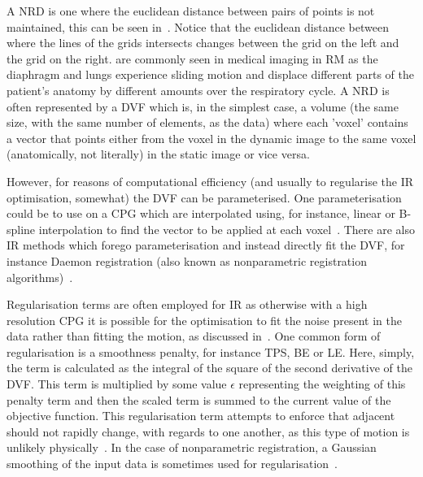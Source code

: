                 A \gls{NRD} is one where the euclidean distance between pairs of points is not maintained, this can be seen in~. Notice that the euclidean distance between where the lines of the grids intersects changes between the grid on the left and the grid on the right. %
                 are commonly seen in medical imaging in \gls{RM} as the diaphragm and lungs experience sliding motion and displace different parts of the patient's anatomy by different amounts over the respiratory cycle. A \gls{NRD} is often represented by a \gls{DVF} which is, in the simplest case, a volume (the same size, with the same number of elements, as the data) where each 'voxel' contains a vector that points either from the voxel in the dynamic image to the same voxel (anatomically, not literally) in the static image or vice versa.
                
                However, for reasons of computational efficiency (and usually to regularise the \gls{IR} optimisation, somewhat) the \gls{DVF} can be parameterised. One parameterisation could be to use  on a \gls{CPG} which are interpolated using, for instance, linear or B-spline interpolation to find the vector to be applied at each voxel~\parencite{Bardinet1996, Rueckertetal.1999, Mattes2003, JacobsonFesslerMotionCorrectionBib}. There are also \gls{IR} methods which forego parameterisation and instead directly fit the \gls{DVF}, for instance Daemon registration (also known as nonparametric registration algorithms)~\parencite{Vercauteren2009DiffeomorphicRegistration.}.
                
                Regularisation terms are often employed for  \gls{IR} as otherwise with a high resolution \gls{CPG} it is possible for the optimisation to fit the noise present in the data rather than fitting the motion, as discussed in~. One common form of regularisation is a smoothness penalty, for instance \gls{TPS}, \gls{BE} or \gls{LE}. Here, simply, the term is calculated as the integral of the square of the second derivative of the \gls{DVF}. This term is multiplied by some value $\epsilon$ representing the weighting of this penalty term and then the scaled term is summed to the current value of the objective function. This regularisation term attempts to enforce that adjacent  should not rapidly change, with regards to one another, as this type of motion is unlikely physically~\parencite{Duchon1977SplinesSpaces}. In the case of nonparametric registration, a Gaussian smoothing of the input data is sometimes used for regularisation~\parencite{Vercauteren2009DiffeomorphicRegistration.}.
        
